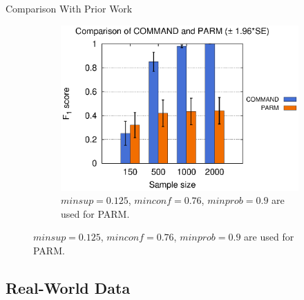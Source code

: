 \documentclass[hyperref={pdfpagelabels=false}]{beamer}
\begin{document}
\begin{frame}{Comparison With Prior Work}
\begin{figure}[!ht]
\begin{subfigure}[t]{0.49\linewidth}
			\includegraphics[width=0.8\linewidth]{figures/F1_parm.eps}
			\caption{\footnotesize $ minsup=0.125$, $minconf=0.76$, $minprob=0.9$ are used for PARM.}
		\end{subfigure}							
	\end{figure}		
\end{frame}			

\subsection{Real-World Data}
\end{document}
